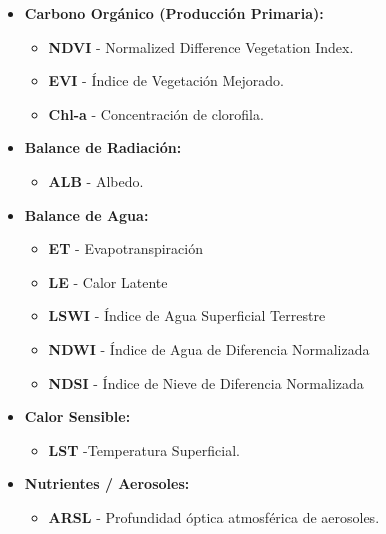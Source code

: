 \documentclass[
]{book}
\providecommand{\tightlist}{%
  \setlength{\itemsep}{0pt}\setlength{\parskip}{0pt}}
\begin{document}
\begin{itemize}
\tightlist
\item
  \textbf{Carbono Orgánico (Producción Primaria):}

  \begin{itemize}
  \tightlist
  \item
    \textbf{NDVI} - Normalized Difference Vegetation Index.\\
  \item
    \textbf{EVI} - Índice de Vegetación Mejorado.\\
  \item
    \textbf{Chl-a} - Concentración de clorofila.\\
  \end{itemize}
\item
  \textbf{Balance de Radiación:}

  \begin{itemize}
  \tightlist
  \item
    \textbf{ALB} - Albedo.\\
  \end{itemize}
\item
  \textbf{Balance de Agua:}

  \begin{itemize}
  \tightlist
  \item
    \textbf{ET} - Evapotranspiración\\
  \item
    \textbf{LE} - Calor Latente\\
  \item
    \textbf{LSWI} - Índice de Agua Superficial Terrestre\\
  \item
    \textbf{NDWI} - Índice de Agua de Diferencia Normalizada\\
  \item
    \textbf{NDSI} - Índice de Nieve de Diferencia Normalizada\\
  \end{itemize}
\item
  \textbf{Calor Sensible:}

  \begin{itemize}
  \tightlist
  \item
    \textbf{LST} -Temperatura Superficial.\\
  \end{itemize}
\item
  \textbf{Nutrientes / Aerosoles:}

  \begin{itemize}
  \tightlist
  \item
    \textbf{ARSL} - Profundidad óptica atmosférica de aerosoles.
  \end{itemize}
\end{itemize}
\end{document}
